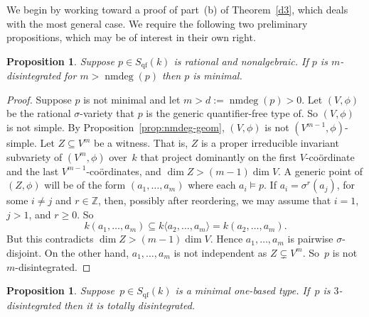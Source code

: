 \documentclass[\DocOpts]{amsart}
\newtheorem{proposition}[theorem]{Proposition}
\theoremstyle{definition}
\def\qf{\operatorname{qf}}
\def\nmdeg{\operatorname{nmdeg}}
\def\ZZ{\mathbb{Z}}
\newcommand{\<}{\langle}
\renewcommand{\>}{\rangle}
\begin{document}
We begin by working toward a proof of part~(b) of Theorem~\ref{d3}, which deals with the most general case.
We require the following two preliminary propositions, which may be of interest in their own right.


\begin{proposition}
\label{dismin}
Suppose $p\in S_{\qf}(k)$ is rational and nonalgebraic.
If $p$ is $m$-disintegrated for $m>\nmdeg(p)$ then $p$ is minimal.
\end{proposition}

\begin{proof}
Suppose $p$ is not minimal and let $m>d:=\nmdeg(p)>0$.
Let $(V,\phi)$ be the rational $\sigma$-variety that $p$ is the generic quantifier-free type of.
So $(V,\phi)$ is not simple.
By Proposition~\ref{prop:nmdeg-geom}, $(V,\phi)$ is not $(V^{m-1},\phi)$-simple.
Let $Z\subseteq V^m$ be a witness.
That is, $Z$ is a proper irreducible invariant subvariety of $(V^m,\phi)$ over~$k$ that project dominantly on the first $V$-co\"ordinate and the last $V^{m-1}$-co\"ordinates, and $\dim Z>(m-1)\dim V$.
A generic point of $(Z,\phi)$ will be of the form $(a_1,\dots,a_m)$ where each $a_i\models p$.
If $a_i=\sigma^r(a_j)$, for some $i\neq j$ and $r\in\ZZ$, then, possibly after reordering, we may assume that $i=1$, $j>1$, and $r\geq 0$.
So
$$k(a_1,\dots,a_m)\subseteq k\langle a_2,\dots,a_m\rangle=k(a_2,\dots,a_m).$$
But this contradicts $\dim Z>(m-1)\dim V$.
Hence $a_1,\dots,a_m$ is pairwise $\sigma$-disjoint.
On the other hand, $a_1,\dots, a_m$ is not independent as $Z\subsetneq V^m$.
So~$p$ is not $m$-disintegrated.
\end{proof}


\begin{proposition}\label{min1based-dis}
Suppose~$p\in S_{\qf}(k)$ is a minimal one-based type.
If~$p$ is $3$-disintegrated then it is totally disintegrated.
\end{proposition}
\end{document}
